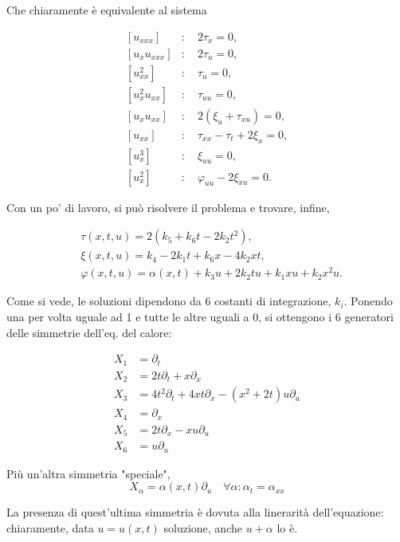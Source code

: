 \documentclass{report}
\begin{document}
Che chiaramente è equivalente al sistema 

\[
\begin{aligned}
[u_{xxx}]      &:\quad 2\tau_x = 0,\\
[u_x u_{xxx}]  &:\quad 2\tau_u = 0,\\
[u_{xx}^2]     &:\quad \tau_u = 0,\\
[u_x^2 u_{xx}] &:\quad \tau_{uu} = 0,\\
[u_x u_{xx}]   &:\quad 2(\xi_u + \tau_{xu}) = 0,\\
[u_{xx}]       &:\quad \tau_{xx} - \tau_t + 2\xi_x = 0,\\
[u_x^3]        &:\quad \xi_{uu} = 0,\\
[u_x^2]        &:\quad \varphi_{uu} - 2\xi_{xu} = 0.
\end{aligned}
\]

Con un po' di lavoro, si può risolvere il problema e trovare, infine,


\begin{align}
&\tau(x,t,u) = 2\left(k_5 + k_6 t - 2k_2 t^2\right), \\
&\xi(x,t,u) = k_4 - 2k_1 t + k_6 x - 4k_2 x t, \\
&\varphi(x,t,u) = \alpha(x,t) + k_3 u + 2k_2 t u + k_1 x u + k_2 x^2 u.
\end{align}

Come si vede, le soluzioni dipendono da 6 costanti di integrazione, $k_i$. Ponendo una per volta uguale ad 1 e tutte le altre uguali a 0, si ottengono i 6 generatori delle simmetrie dell'eq. del calore: 

\begin{align}
    X_1 &= \partial_t \\
    X_2 &= 2t\partial_t + x\partial_x \\
    X_3 &= 4t^2\partial_t + 4xt\partial_x - (x^2 + 2t)u\partial_u \\
    X_4 &= \partial_x \\
    X_5 &= 2t\partial_x - xu\partial_u \\
    X_6 &= u\partial_u
\end{align}

Più un'altra simmetria "speciale", 
\begin{equation}
    X_{\alpha} = \alpha(x, t)\partial_u \quad \forall \alpha : \alpha_t = \alpha_{xx}
\end{equation}

La presenza di quest'ultima simmetria è dovuta alla linerarità dell'equazione: chiaramente, data $u=u(x, t)$ soluzione, anche $u+\alpha$ lo è. 
\end{document}
